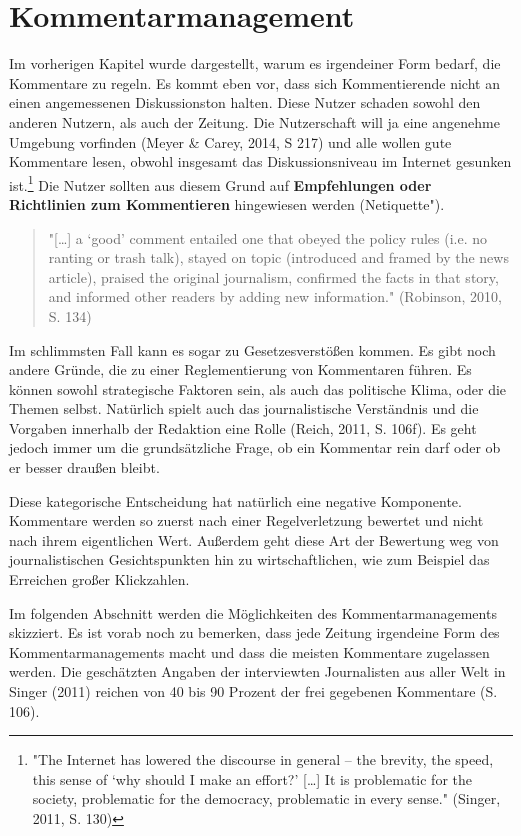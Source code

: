 \chapter{Kommentarmanagement}


Im vorherigen Kapitel wurde dargestellt, warum es irgendeiner Form bedarf, die Kommentare zu regeln. 
Es kommt eben vor, dass sich Kommentierende nicht an einen angemessenen Diskussionston halten. Diese Nutzer schaden sowohl den anderen Nutzern, als auch der Zeitung. Die Nutzerschaft will ja eine angenehme Umgebung vorfinden (Meyer \& Carey, 2014, S 217) und alle wollen \glqq gute\grqq\- Kommentare lesen, obwohl insgesamt das Diskussionsniveau im Internet gesunken ist.\footnote{"The Internet has lowered the
discourse in general – the brevity, the speed, this sense of ‘why should I make
an effort?' [\ldots] It is problematic for the society, problematic for the democracy, problematic in every sense." (Singer, 2011, S. 130)}
Die Nutzer sollten aus diesem Grund auf {\bf Empfehlungen oder Richtlinien zum Kommentieren} hingewiesen werden (\glqq Netiquette"). 


\begin{quote}
"[\ldots] a ‘good’ comment entailed one that obeyed the policy rules (i.e. no
ranting or trash talk), stayed on topic (introduced and framed by the news article), praised
the original journalism, confirmed the facts in that story, and informed other readers by
adding new information." (Robinson, 2010, S. 134)
\end{quote}

Im schlimmsten Fall kann es sogar zu Gesetzesverstößen kommen. Es gibt noch andere Gründe, die zu einer Reglementierung von Kommentaren führen. Es können sowohl strategische Faktoren sein, als auch das politische Klima, oder die Themen selbst. Natürlich spielt auch das journalistische Verständnis und die Vorgaben innerhalb der Redaktion eine Rolle (Reich, 2011, S. 106f).
Es geht jedoch immer um die grundsätzliche Frage, ob ein Kommentar \glqq rein\grqq\- darf oder ob er besser \glqq draußen\grqq\-  bleibt.

Diese kategorische Entscheidung hat natürlich eine negative Komponente. Kommentare werden so zuerst nach einer Regelverletzung bewertet und nicht nach ihrem eigentlichen Wert. Außerdem geht diese Art der Bewertung weg von journalistischen Gesichtspunkten hin zu wirtschaftlichen, wie zum Beispiel das Erreichen großer Klickzahlen.  

Im folgenden Abschnitt werden die Möglichkeiten des Kommentarmanagements skizziert. Es ist vorab noch zu bemerken, dass jede Zeitung irgendeine Form des Kommentarmanagements macht und dass die meisten Kommentare zugelassen werden. Die geschätzten Angaben der interviewten Journalisten aus aller Welt in Singer (2011) reichen von 40 bis 90 Prozent der frei gegebenen Kommentare (S. 106). 


